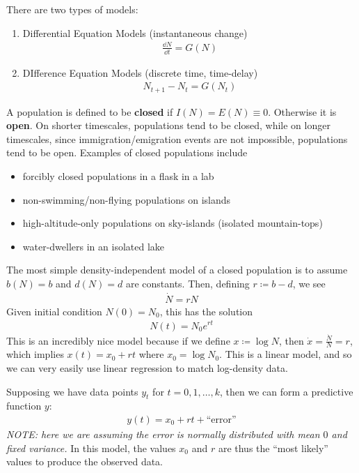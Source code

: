 \documentclass{article}
\begin{document}
    There are two types of models:
    \begin{enumerate}
        \item Differential Equation Models (instantaneous change)
        \begin{align*}
            \frac{\dd N}{\dd t} = G(N)
        \end{align*}
        \item DIfference Equation Models (discrete time, time-delay)
        \begin{align*}
            N_{t+1} - N_t = G(N_t)
        \end{align*}
    \end{enumerate}

    A population is defined to be \textbf{closed} if $I(N) = E(N) \equiv 0$.  Otherwise it is \textbf{open}.  On shorter timescales, populations tend to be closed, while on longer timescales, since immigration/emigration events are not impossible, populations tend to be open.  Examples of closed populations include
    \begin{itemize}
        \item forcibly closed populations in a flask in a lab
        \item non-swimming/non-flying populations on islands
        \item high-altitude-only populations on sky-islands (isolated mountain-tops)
        \item water-dwellers in an isolated lake
    \end{itemize}

    The most simple density-independent model of a closed population is to assume $b(N) = b$ and $d(N) = d$ are constants.  Then, defining $r \coloneqq b - d$, we see
    \begin{align*}
        \dot{N} = rN
    \end{align*}
    Given initial condition $N(0) = N_0$, this has the solution
    \begin{align*}
        N(t) = N_0e^{rt}
    \end{align*}
    This is an incredibly nice model because if we define $x \coloneqq \log N$, then $\dot{x} = \frac{\dot{N}}{N} = r$, which implies $x(t) = x_0 + rt$ where $x_0 = \log N_0$.  This is a linear model, and so we can very easily use linear regression to match log-density data.

    Supposing we have data points $y_t$ for $t = 0, 1, \dots, k$, then we can form a predictive function $y$:
    \begin{align*}
        y(t) = x_0 + rt + \text{``error''}
    \end{align*}
    \textit{NOTE: here we are assuming the error is normally distributed with mean $0$ and fixed variance.}  In this model, the values $x_0$ and $r$ are thus the ``most likely'' values to produce the observed data.

    
\end{document}

